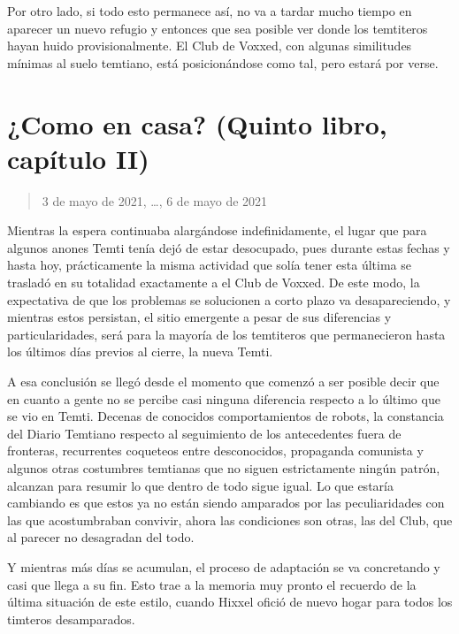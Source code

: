 \documentclass[
  spanish,
]{book}
\begin{document}
Por otro lado, si todo esto permanece así, no va a tardar mucho tiempo en aparecer un nuevo refugio y entonces que sea posible ver donde los temtiteros hayan huido provisionalmente. El Club de Voxxed, con algunas similitudes mínimas al suelo temtiano, está posicionándose como tal, pero estará por verse.

\hypertarget{como-en-casa-quinto-libro-capuxedtulo-ii}{%
\section{¿Como en casa? (Quinto libro, capítulo II)}\label{como-en-casa-quinto-libro-capuxedtulo-ii}}

\begin{quote}
3 de mayo de 2021, \ldots, 6 de mayo de 2021
\end{quote}

Mientras la espera continuaba alargándose indefinidamente, el lugar que para algunos anones Temti tenía dejó de estar desocupado, pues durante estas fechas y hasta hoy, prácticamente la misma actividad que solía tener esta última se trasladó en su totalidad exactamente a el Club de Voxxed. De este modo, la expectativa de que los problemas se solucionen a corto plazo va desapareciendo, y mientras estos persistan, el sitio emergente a pesar de sus diferencias y particularidades, será para la mayoría de los temtiteros que permanecieron hasta los últimos días previos al cierre, la nueva Temti.

A esa conclusión se llegó desde el momento que comenzó a ser posible decir que en cuanto a gente no se percibe casi ninguna diferencia respecto a lo último que se vio en Temti. Decenas de conocidos comportamientos de robots, la constancia del Diario Temtiano respecto al seguimiento de los antecedentes fuera de fronteras, recurrentes coqueteos entre desconocidos, propaganda comunista y algunos otras costumbres temtianas que no siguen estrictamente ningún patrón, alcanzan para resumir lo que dentro de todo sigue igual. Lo que estaría cambiando es que estos ya no están siendo amparados por las peculiaridades con las que acostumbraban convivir, ahora las condiciones son otras, las del Club, que al parecer no desagradan del todo.

Y mientras más días se acumulan, el proceso de adaptación se va concretando y casi que llega a su fin. Esto trae a la memoria muy pronto el recuerdo de la última situación de este estilo, cuando Hixxel ofició de nuevo hogar para todos los timteros desamparados.
\end{document}
